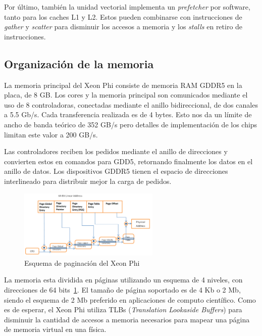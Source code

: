 Por \'ultimo, tambi\'en la unidad vectorial implementa un \textit{prefetcher} por software, tanto para los caches L1 y L2. Estos
pueden combinarse con instrucciones de \textit{gather} y \textit{scatter} para disminuir los accesos a memoria y los \textit{stalls}
en retiro de instrucciones.

\subsection{Organizaci\'on de la memoria}

La memoria principal del Xeon Phi consiste de memoria RAM GDDR5 en la placa, de 8 GB. Los cores y la memoria principal son comunicados mediante el uso de 8
controladoras, conectadas mediante el anillo bidireccional, de dos canales a 5.5 Gb/s. Cada transferencia realizada es de 4 bytes. 
Esto nos da un l\'imite de ancho de banda te\'orico de 352 GB/s pero detalles de implementaci\'on de los chips limitan este valor a 200 GB/s. 

Las controladores reciben los pedidos mediante el anillo de direcciones y convierten estos en comandos para GDD5, retornando finalmente los datos en
el anillo de datos. Los dispositivos GDDR5 tienen el espacio de direcciones interlineado para distribuir mejor la carga de pedidos.

\begin{figure}[htbp]
   \centering
   \includegraphics[width=0.6\textwidth]{images/xeon-phi-addressing.png}
   \caption{Esquema de paginaci\'on del Xeon Phi}
   \label{fig::xeon_phi_addressing}
\end{figure}

La memoria esta dividida en p\'aginas utilizando un esquema de 4 niveles, con direcciones de 64 bits~\ref{fig::xeon_phi_addressing}. El tama\~no de p\'agina soportado es de 4 Kb
o 2 Mb, siendo el esquema de 2 Mb preferido en aplicaciones de computo cient\'ifico. Como es de esperar, el Xeon Phi utiliza TLBs (\textit{Translation Lookaside
Buffers}) para disminuir la cantidad de accesos a memoria necesarios para mapear una p\'agina de memoria virtual en una f\'isica.

